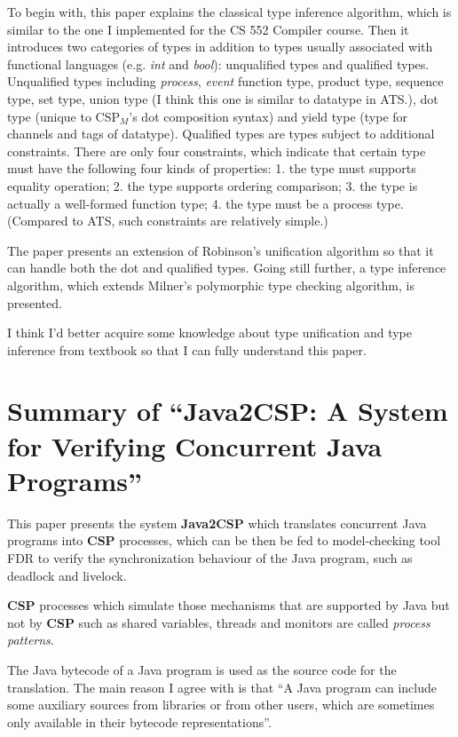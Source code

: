 \documentclass{llncs}
\newcommand{\cspm}{CSP$_M$}
\newcommand{\cspbold}{\textbf{CSP}}
\begin{document}
To begin with, this paper explains the classical type inference algorithm, which
is similar to the one I implemented for the CS 552 Compiler course. Then it
introduces two categories of types in addition to types usually associated with
functional languages (e.g. \emph{int} and \emph{bool}): unqualified types and qualified types.
Unqualified types including \emph{process}, \emph{event} function type, product
type, sequence type, set type, union type (I think this one is similar to
datatype in ATS.), dot type (unique to \cspm{}'s dot composition syntax) and
yield type (type for channels and tags of datatype). Qualified types are types
subject to additional constraints. There are only four constraints, which indicate
that certain type must have the following four kinds of properties: 1. the type
must supports equality operation; 2. the type supports ordering comparison; 3.
the type is actually a well-formed function type; 4. the type must be a process
type. (Compared to ATS, such constraints are relatively simple.)

The paper presents an extension of Robinson's unification algorithm so that it
can handle both the dot and qualified types. Going still further, a type
inference algorithm, which extends Milner's polymorphic type checking algorithm,
is presented.

I think I'd better acquire some knowledge about type unification and type
inference from textbook so that I can fully understand this paper.

\newpage
\section{Summary of ``Java2CSP: A System for Verifying Concurrent Java 
Programs''\cite{Shi2000Java2CSP}}
  \label{section:java2csp}
This paper presents the system \textbf{Java2CSP} which translates concurrent
Java programs into \cspbold{} processes, which can be then be fed to
model-checking tool FDR to verify the synchronization behaviour of the
Java program, such as deadlock and livelock.

\cspbold{} processes which simulate those mechanisms that are supported by Java
but not by \cspbold{} such as shared variables, threads and monitors are called
\emph{process patterns}.

The Java bytecode of a Java program is used as the source code for the
translation. The main reason I agree with is that ``A Java program can include
some auxiliary sources from libraries or from other users, which are sometimes
only available in their bytecode representations''.
\end{document}
